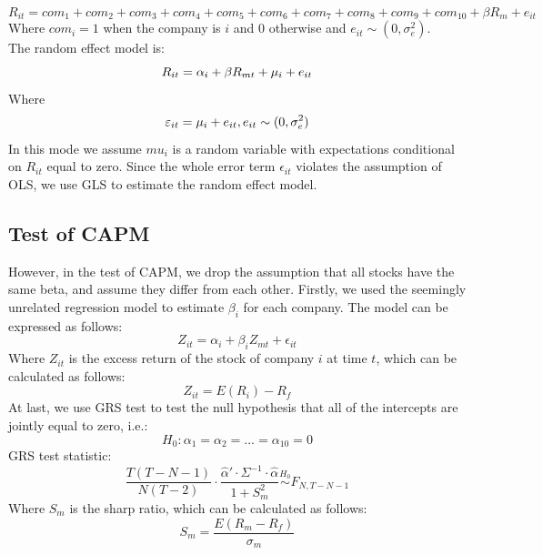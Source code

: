     \begin{equation}\label{}
    R_{it}={com}_{1}+{com}_{2}+{com}_{3}+{com}_{4}+{com}_{5}+{com}_{6}+{com}_{7}+{com}_{8}+{com}_{9}+{com}_{10}+\beta R_{m}+e_{it}
    \end{equation}
    Where ${com}_{i}=1$ when the company is $i$ and $0$ otherwise and $e_{it} \sim (0,\sigma^{2}_{e})$.\\
    The random effect model is:\\
    \begin{equation}\label{}
    R_{it}=\alpha_i+\beta R_{mt}+\mu_i+e_{it}\\
    \end{equation}
    Where
    \begin{equation}\label{}
    \varepsilon_{it}=\mu_i+e_{it},
    e_{it} \sim (0,\sigma^{2}_{e})\\
    \end{equation}
    In this mode we assume $mu_{i}$ is a random variable with expectations conditional on $R_{it}$ equal to zero. Since the whole error term $\epsilon_{it}$ violates the assumption of OLS, we use GLS to estimate the random effect model.\\

    \subsection{Test of CAPM}
    \noindent However, in the test of CAPM, we drop the assumption that all stocks have the same beta, and assume they differ from each other. Firstly, we used the seemingly unrelated regression model to estimate $\beta_{i}$ for each company. The model \citep{sharpe1964capital, sharpe1970portfolio}can be expressed as follows:\\
    \begin{equation}\label{}
    Z_{it}=\alpha_{i}+\beta_{i}Z_{mt}+\epsilon_{it}
    \end{equation}
    Where $Z_{it}$ is the excess return of the stock of company $i$ at time $t$, which can be calculated as follows:\\
    \begin{equation}\label{}
    Z_{it}=E(R_{i})-R_{f}
    \end{equation}
    At last, we use GRS test to test the null hypothesis that all of the intercepts are jointly equal to zero, i.e.:\\
    \begin{equation}\label{}
    H_{0}:\alpha_{1}=\alpha_{2}=...=\alpha_{10}=0
    \end{equation}
    GRS test \citep{gibbons1989test} statistic:\\
    \begin{equation}\label{}
    \frac{T(T-N-1)}{N(T-2)}\cdot \frac{\hat{\alpha}'\cdot \Sigma^{-1}\cdot \hat{\alpha}}{1+S^2_{m}}\overset{H_{0}}\sim F_{N,T-N-1}
    \end{equation}
    Where $S_{m}$ is the sharp ratio, which can be calculated as follows:\\
    \begin{equation}\label{}
    S_{m}=\frac{E(R_{m}-R_{f})}{\sigma_{m}}
    \end{equation}

